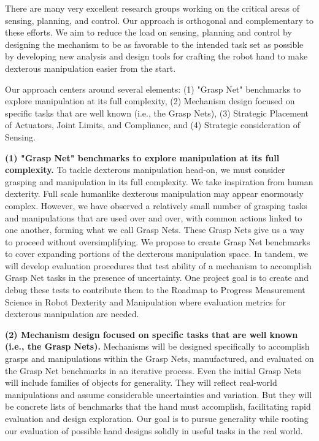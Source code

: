 There are many very excellent research groups working on the critical areas of sensing, planning, and control.   Our approach is orthogonal and complementary to these efforts.    We aim to reduce the load on sensing, planning and control by designing the mechanism to be as favorable to the intended task set as possible by developing new analysis and design tools for crafting the robot hand to make dexterous manipulation easier from the start.

Our approach centers around several elements:  (1) "Grasp Net" benchmarks to explore manipulation at its full complexity, (2) Mechanism design focused on specific tasks that are well known (i.e., the Grasp Nets), (3) Strategic Placement of Actuators, Joint Limits, and Compliance, and (4) Strategic consideration of Sensing.

\smallskip\noindent
{\bf (1) "Grasp Net" benchmarks to explore manipulation at its full complexity.}   To tackle dexterous manipulation head-on, we must consider grasping and manipulation in its full complexity.   We take inspiration from human dexterity.   Full scale humanlike dexterous manipulation may appear enormously complex.   However,  we have observed a relatively small number of grasping tasks and manipulations that are used over and over, with common actions linked to one another, forming what we call Grasp Nets.   These Grasp Nets give us a way to proceed without oversimplifying.  We propose to create Grasp Net benchmarks to cover expanding portions of the dexterous manipulation space.   In tandem, we will develop evaluation procedures that test ability of a mechanism to accomplish Grasp Net tasks in the presence of uncertainty.   One project goal is to create and debug these tests to contribute them to the Roadmap to Progress Measurement Science in Robot Dexterity and Manipulation \cite{falco2014roadmap} where evaluation metrics for dexterous manipulation are needed.

\smallskip\noindent	
{\bf (2) Mechanism design focused on specific tasks that are well known (i.e., the Grasp Nets).}   Mechanisms will be designed specifically to accomplish grasps and manipulations within the Grasp Nets, manufactured, and evaluated on the Grasp Net benchmarks in an iterative process.
Even the initial Grasp Nets will include families of objects for generality.   They will reflect real-world manipulations and assume considerable uncertainties and variation.   But they will be concrete lists of benchmarks that the hand must accomplish, facilitating rapid evaluation and design exploration.   Our goal is to pursue generality while rooting our evaluation of possible hand designs solidly in useful tasks in the real world.

